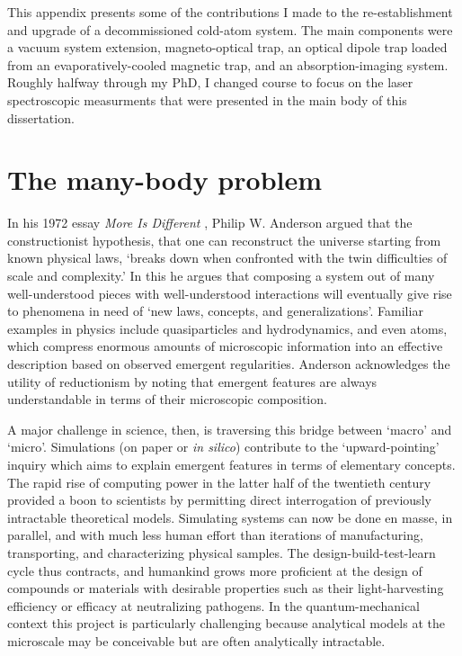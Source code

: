 
This appendix presents some of the contributions I made to the re-establishment and upgrade of a decommissioned cold-atom system. The main components were a vacuum system extension, magneto-optical trap, an optical dipole trap loaded from an evaporatively-cooled magnetic trap, and an absorption-imaging system. Roughly halfway through my PhD, I changed course to focus on the laser spectroscopic measurments that were presented in the main body of this dissertation.

\section{The many-body problem}


	In his 1972 essay \emph{More Is Different} \cite{Anderson72},  Philip W. Anderson argued that the constructionist hypothesis, that one can reconstruct the universe starting from known physical laws,  `breaks down when confronted with the twin difficulties of scale and complexity.' 
	In this he argues that composing a system out of many well-understood pieces with well-understood interactions will eventually give rise to  phenomena in need of `new laws, concepts, and generalizations'.
	Familiar examples in physics include quasiparticles and hydrodynamics, and even atoms, which compress enormous amounts of microscopic information into an effective description based on observed emergent regularities.
	Anderson acknowledges the utility of reductionism by noting that emergent features are always understandable in terms of their microscopic composition.

	A major challenge in science, then, is traversing this bridge between `macro' and `micro'.
	Simulations (on paper or \emph{in silico}) contribute to the `upward-pointing' inquiry which aims to explain emergent features in terms of elementary concepts.
	The rapid rise of computing power in the latter half of the twentieth century provided a boon to scientists by permitting direct interrogation of previously intractable theoretical models.
	Simulating systems can now be done en masse, in parallel, and with much less human effort than iterations of manufacturing, transporting, and characterizing physical samples.
	The design-build-test-learn cycle thus contracts, and humankind grows more proficient at the design of compounds or materials with desirable properties such as their light-harvesting efficiency or efficacy at neutralizing pathogens.
	In the quantum-mechanical context this project is particularly challenging because analytical models at the microscale may be conceivable but are often analytically intractable.
	



